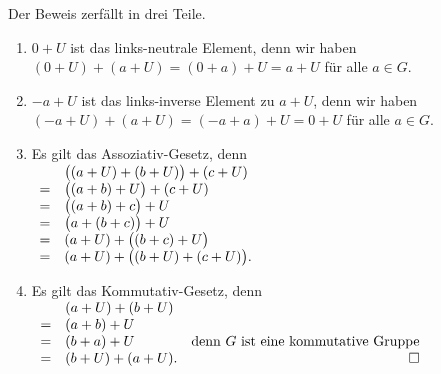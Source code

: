 \proof
Der Beweis zerf\"{a}llt in drei Teile.
\begin{enumerate}
\item $0 + U$ ist das links-neutrale Element, denn wir haben
      \\[0.2cm]
      \hspace*{1.3cm}
      $(0 + U) + (a + U) = (0 + a) + U = a + U$ \quad f\"{u}r alle $a \in G$.
\item $-a + U$ ist das links-inverse Element zu $a + U$, denn wir haben
      \\[0.2cm]
      \hspace*{1.3cm}
      $(-a + U) + (a + U) = (-a + a) + U = 0 + U$ \quad f\"{u}r alle $a \in G$.
\item Es gilt das Assoziativ-Gesetz, denn
      \\[0.2cm]
      \hspace*{1.3cm}
      $
      \begin{array}[t]{cl}
        & \bigl((a + U) + (b + U)\bigr) + (c + U)   \\
      = & \bigl((a + b) + U\bigr) + (c + U)         \\
      = & \bigl((a + b) + c\bigr) + U               \\
      = & \bigl(a + (b + c)\bigr) + U               \\
      = & (a + U) + \bigl((b + c) + U\bigr)         \\
      = & (a + U) + \bigl((b + U) + (c + U)\bigr).  \\
      \end{array}
      $
\item Es gilt das Kommutativ-Gesetz, denn
      \\[0.2cm]
      \hspace*{1.3cm}
      $
      \begin{array}[t]{cll}
        & (a + U) + (b + U) \\
      = & (a + b) + U       \\
      = & (b + a) + U & \mbox{denn $G$ ist eine kommutative Gruppe} \\
      = & (b + U) + (a + U). & \hspace*{\fill} \Box
      \end{array}
      $
\end{enumerate}
\pagebreak

